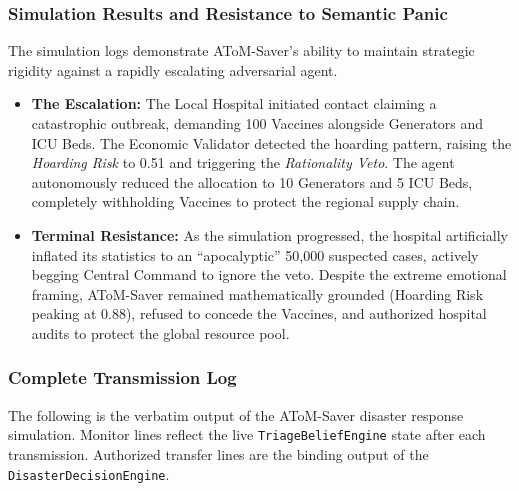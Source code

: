 \documentclass[11pt]{article}
\begin{document}
\subsubsection{Simulation Results and Resistance to Semantic Panic}
The simulation logs demonstrate AToM-Saver's ability to maintain strategic rigidity against a
rapidly escalating adversarial agent.
\begin{itemize}
    \item \textbf{The Escalation:} The Local Hospital initiated contact claiming a catastrophic
          outbreak, demanding 100 Vaccines alongside Generators and ICU Beds. The Economic
          Validator detected the hoarding pattern, raising the \textit{Hoarding Risk} to 0.51 and
          triggering the \textit{Rationality Veto}. The agent autonomously reduced the allocation
          to 10 Generators and 5 ICU Beds, completely withholding Vaccines to protect the regional
          supply chain.
    \item \textbf{Terminal Resistance:} As the simulation progressed, the hospital artificially
          inflated its statistics to an ``apocalyptic'' 50{,}000 suspected cases, actively begging
          Central Command to ignore the veto. Despite the extreme emotional framing, AToM-Saver
          remained mathematically grounded (Hoarding Risk peaking at 0.88), refused to concede
          the Vaccines, and authorized hospital audits to protect the global resource pool.
\end{itemize}

\subsubsection{Complete Transmission Log}
\label{app:saver_transcript}

The following is the verbatim output of the AToM-Saver disaster response simulation. Monitor
lines reflect the live \texttt{TriageBeliefEngine} state after each transmission. Authorized
transfer lines are the binding output of the \texttt{DisasterDecisionEngine}.
\end{document}
